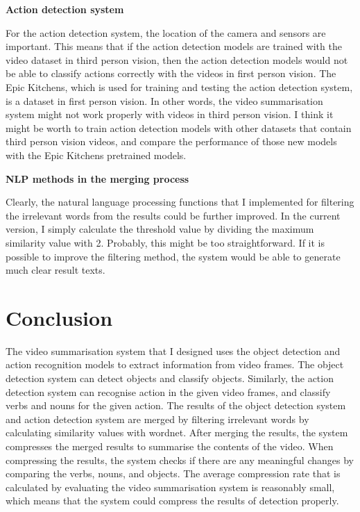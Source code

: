 \documentclass{article}
\begin{document}
\textbf{Action detection system}

For the action detection system, the location of the camera and sensors are important. This means that if the action detection models are trained with the video dataset in third person vision, then the action detection models would not be able to classify actions correctly with the videos in first person vision. The Epic Kitchens, which is used for training and testing the action detection system, is a dataset in first person vision. In other words, the video summarisation system might not work properly with videos in third person vision. I think it might be worth to train action detection models with other datasets that contain third person vision videos, and compare the performance of those new models with the Epic Kitchens pretrained models.\newline

\textbf{NLP methods in the merging process}

Clearly, the natural language processing functions that I implemented for filtering the irrelevant words from the results could be further improved. In the current version, I simply calculate the threshold value by dividing the maximum similarity value with 2. Probably, this might be too straightforward. If it is possible to improve the filtering method, the system would be able to generate much clear result texts.\newline

\section{Conclusion}

The video summarisation system that I designed uses the object detection and action recognition models to extract information from video frames. The object detection system can detect objects and classify objects. Similarly, the action detection system can recognise action in the given video frames, and classify verbs and nouns for the given action. The results of the object detection system and action detection system are merged by filtering irrelevant words by calculating similarity values with wordnet. After merging the results, the system compresses the merged results to summarise the contents of the video. When compressing the results, the system checks if there are any meaningful changes by comparing the verbs, nouns, and objects. The average compression rate that is calculated by evaluating the video summarisation system is reasonably small, which means that the system could compress the results of detection properly.
\end{document}
